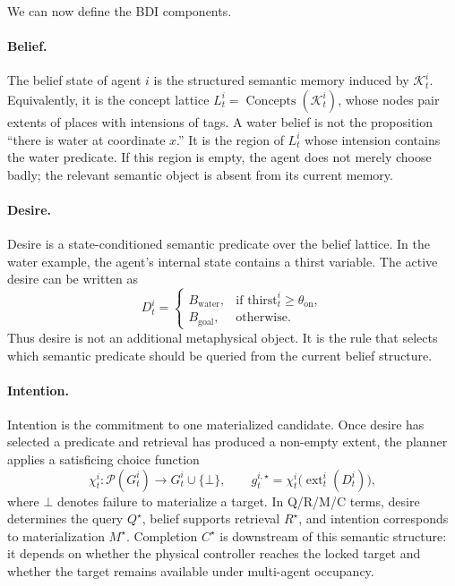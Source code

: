 \documentclass{article}
\begin{document}
We can now define the BDI components.

\paragraph{Belief.} The belief state of agent $i$ is the structured
semantic memory induced by $\mathcal{K}_t^i$. Equivalently, it is the
concept lattice $L_t^i=\operatorname{Concepts}(\mathcal{K}_t^i)$, whose
nodes pair extents of places with intensions of tags. A water belief is
not the proposition ``there is water at coordinate $x$.'' It is the
region of $L_t^i$ whose intension contains the water predicate. If this
region is empty, the agent does not merely choose badly; the relevant
semantic object is absent from its current memory.

\paragraph{Desire.} Desire is a state-conditioned semantic predicate
over the belief lattice. In the water example, the agent's internal
state contains a thirst variable. The active desire can be written as
\[
D_t^i =
\begin{cases}
B_{\mathrm{water}}, & \text{if } \mathrm{thirst}_t^i\geq\theta_{\mathrm{on}},\\
B_{\mathrm{goal}}, & \text{otherwise.}
\end{cases}
\]
Thus desire is not an additional metaphysical object. It is the rule
that selects which semantic predicate should be queried from the
current belief structure.

\paragraph{Intention.} Intention is the commitment to one materialized
candidate. Once desire has selected a predicate and retrieval has
produced a non-empty extent, the planner applies a satisficing choice
function
\[
\chi_t^i:\mathcal{P}(G_t^i)\rightarrow G_t^i\cup\{\bot\},
\qquad
g_t^{i,\star}=\chi_t^i\!\big(\operatorname{ext}_t^i(D_t^i)\big),
\]
where $\bot$ denotes failure to materialize a target. In Q/R/M/C terms,
desire determines the query $Q^\star$, belief supports retrieval
$R^\star$, and intention corresponds to materialization $M^\star$.
Completion $C^\star$ is downstream of this semantic structure: it
depends on whether the physical controller reaches the locked target
and whether the target remains available under multi-agent occupancy.
\end{document}
